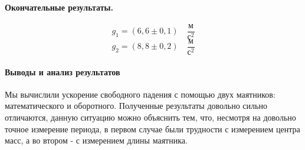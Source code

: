 \documentclass{article}
\begin{document}
\paragraph{Окончательные результаты.}
$$ g_1=(6,6\pm0,1)\quad\frac{\mbox{м}}{\mbox{с}^2}$$
$$ g_2=(8,8\pm0,2)\quad\frac{\mbox{м}}{\mbox{с}^2}$$

\paragraph{Выводы и анализ результатов}
Мы вычислили ускорение свободного падения с помощью двух маятников: математического и оборотного. Полученные результаты довольно сильно отличаются, данную ситуацию можно объяснить тем, что, несмотря на довольно точное измерение периода, в первом случае были трудности с измерением центра масс, а во втором - с измерением длины маятника.
\end{document}
